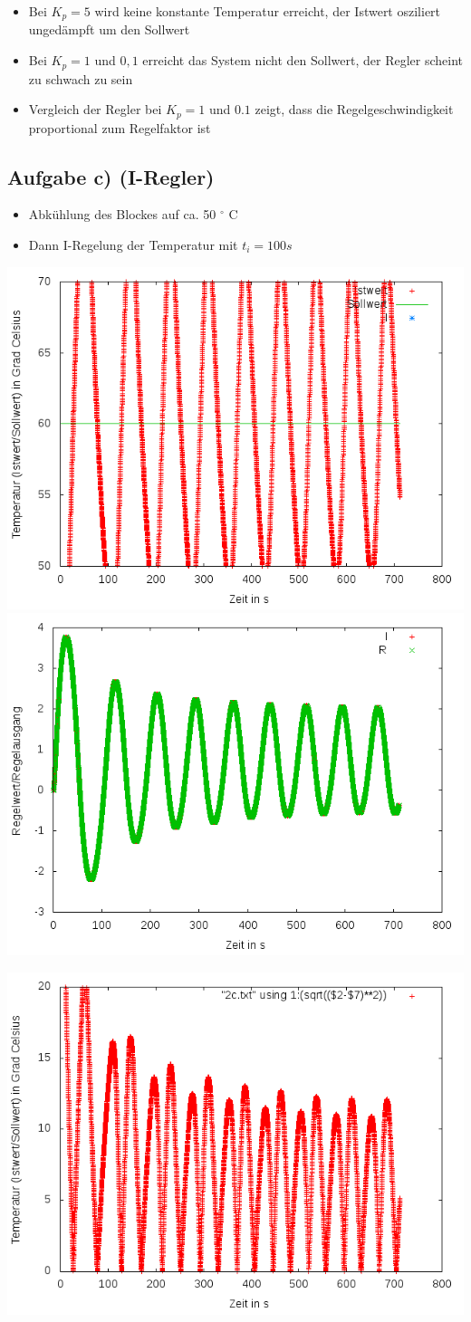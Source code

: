 \documentclass[compress,11pt]{beamer}
\begin{document}
\begin{frame}
\begin{itemize}
\item Bei $K_p = 5$ wird keine konstante Temperatur erreicht, der Istwert osziliert ungedämpft um den Sollwert
\item Bei $K_p = 1$ und $0,1$ erreicht das System nicht den Sollwert, der Regler scheint zu schwach zu sein
\item Vergleich der Regler bei $K_p = 1$ und $0.1$ zeigt, dass die Regelgeschwindigkeit proportional zum Regelfaktor ist 
\end{itemize}
\end{frame}
\subsection{Aufgabe c) (I-Regler)}
\begin{frame}
\begin{itemize}
\item Abkühlung des Blockes auf ca. 50 $^\circ$ C
\item Dann I-Regelung der Temperatur mit $t_i = 100 s$
\end{itemize}
\includegraphics[width=.5\textwidth]{../2aufgabe/2c1}
\includegraphics[width=.5\textwidth]{../2aufgabe/2c1_I}
\end{frame}
\begin{frame}
\includegraphics[width=.5\textwidth]{../2aufgabe/2c1_betrag}
\end{frame}
\end{document}
